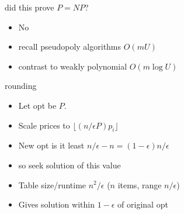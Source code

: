 \documentclass{article}
\begin{document}
did this prove $P=NP$?  
\begin{itemize}
\item No
\item recall pseudopoly algorithms $O(mU)$
\item contrast to weakly polynomial $O(m\log U)$
\end{itemize}

rounding
\begin{itemize}
\item Let opt be $P$.  
\item Scale prices to $\lfloor (n/\epsilon P) p_i \rfloor$
\item New opt is it least $n/\epsilon-n = (1-\epsilon)n/\epsilon$
\item so seek solution of this value
\item Table size/runtime $n^2/\epsilon$ ($n$ items, range $n/\epsilon$)
\item Gives solution within $1-\epsilon$ of original opt
\end{itemize}
\end{document}
